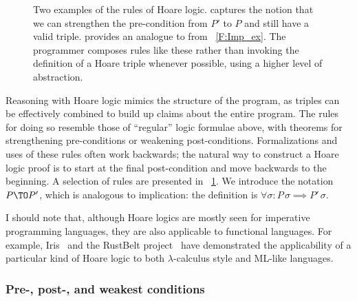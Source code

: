 \begin{figure}[ht]
    \centering
    \caption{Two examples of the rules of Hoare logic.
     captures the notion that we can strengthen the
    pre-condition from \(P'\) to \(P\) and still have a valid triple.
     provides an analogue to  from
    \figurename~\ref{F:Imp_ex}. The programmer composes rules like these rather
    than invoking the definition of a Hoare triple whenever possible, using a
    higher level of abstraction.}\label{F:Hoare_ex}
\end{figure}

Reasoning with Hoare logic mimics the structure of the program, as triples can
be effectively combined to build up claims about the entire program. The rules
for doing so resemble those of ``regular'' logic formulae above, with theorems
for strengthening pre-conditions or weakening post-conditions. Formalizations
and uses of these rules often work backwards; the natural way to construct a
Hoare logic proof is to start at the final post-condition and move backwards to
the beginning. A selection of rules are presented in
\figurename~\ref{F:Hoare_ex}. We introduce the notation \(P \TO P'\), which is
analogous to implication: the definition is \(\forall \sigma: P\, \sigma
\implies P'\, \sigma\).

I should note that, although Hoare logics are mostly seen for imperative
programming languages, they are also applicable to functional languages. For
example, Iris~\cite[\S 5.1]{Krebbers_2017b} and the RustBelt project~\cite[\S
3.2, esp. \figurename~3]{Jung_2018a} have demonstrated the applicability of a
particular kind of Hoare logic to both \(\lambda\)-calculus style and ML-like
languages.

\subsubsection{Pre-, post-, and weakest conditions}

